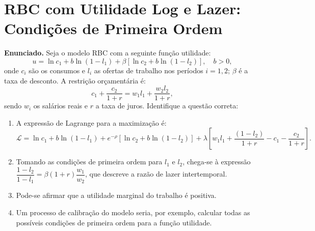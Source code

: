 \documentclass[12pt, a4paper]{article}
\begin{document}
\section{RBC com Utilidade Log e Lazer: Condições de Primeira Ordem}

\textbf{Enunciado.} Seja o modelo RBC com a seguinte função utilidade:
\[
u = \ln c_1 + b\ln(1-l_1) + \beta\!\left[\ln c_2 + b\ln(1-l_2)\right], \quad b > 0,
\]
onde $c_i$ são os consumos e $l_i$ as ofertas de trabalho nos períodos $i=1,2$; $\beta$ é a taxa de desconto. A restrição orçamentária é:
\[
c_1 + \frac{c_2}{1+r} = w_1 l_1 + \frac{w_2 l_2}{1+r},
\]
sendo $w_i$ os salários reais e $r$ a taxa de juros. Identifique a questão correta:

\begin{enumerate}[label=\alph*)]
\item A expressão de Lagrange para a maximização é:
\[
\mathcal{L} = \ln c_1 + b\ln(1-l_1) + e^{-\rho}\!\left[\ln c_2 + b\ln(1-l_2)\right]
  + \lambda\!\left[w_1 l_1 + \frac{(1-l_2)}{1+r} - c_1 - \frac{c_2}{1+r}\right].
\]
\item Tomando as condições de primeira ordem para $l_1$ e $l_2$, chega-se à expressão
$\dfrac{1-l_2}{1-l_1} = \beta(1+r)\dfrac{w_1}{w_2}$, que descreve a razão de lazer intertemporal.
\item Pode-se afirmar que a utilidade marginal do trabalho é positiva.
\item Um processo de calibração do modelo seria, por exemplo, calcular todas as possíveis condições de primeira ordem para a função utilidade.
\end{enumerate}
\end{document}

